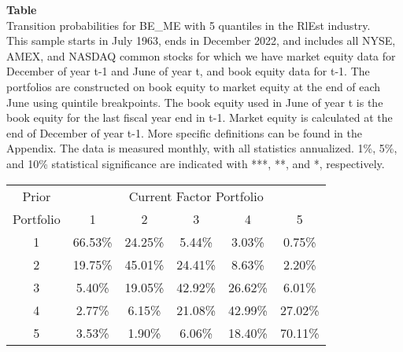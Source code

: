 \begin{table*}[ht!]
\raggedright
{}
\label{tab: transition_probs_BE_ME_RlEst_with_5_quantiles}
\textbf{Table \thetable} \\
Transition probabilities for BE_ME with 5 quantiles in the RlEst industry. \\
\hspace*{1em}This sample starts in July 1963, ends in December 2022, and includes all NYSE, AMEX, and NASDAQ common stocks for which we have market equity data for December of year t-1 and June of year t, and book equity data for t-1. The portfolios are constructed on book equity to market equity at the end of each June using quintile breakpoints.  The book equity used in June of year t is the book equity for the last fiscal year end in t-1.  Market equity is calculated at the end of December of year t-1.  More specific definitions can be found in the Appendix.  The data is measured monthly, with all statistics annualized.  1\%, 5\%, and 10\% statistical significance are indicated with ***, **, and *, respectively. \\
\vspace{0.5em}
\centering
\begin{adjustbox}{max width=\textwidth}
\begin{tabular}{@{}cccccc@{}}
\toprule
Prior & \multicolumn{5}{c}{Current Factor Portfolio} \\
Portfolio & 1 & 2 & 3 & 4 & 5 \\
\midrule
1 & 66.53\% & 24.25\% & 5.44\% & 3.03\% & 0.75\% \\
2 & 19.75\% & 45.01\% & 24.41\% & 8.63\% & 2.20\% \\
3 & 5.40\% & 19.05\% & 42.92\% & 26.62\% & 6.01\% \\
4 & 2.77\% & 6.15\% & 21.08\% & 42.99\% & 27.02\% \\
5 & 3.53\% & 1.90\% & 6.06\% & 18.40\% & 70.11\% \\
\bottomrule
\end{tabular}
\end{adjustbox}
\end{table*}